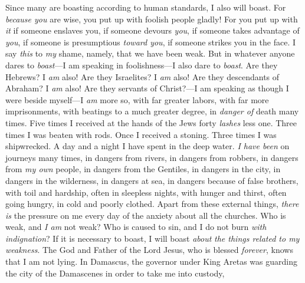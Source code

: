 \begin{biblechapter}
\verse Since many are boasting according to human standards, I also will boast.
\verse For \textit{because you} are wise, you put up with foolish people gladly!
\verse For you put up with \textit{it} if someone enslaves you, if someone devours \textit{you}, if someone takes advantage of \textit{you}, if someone is presumptious \textit{toward you}, if someone strikes you in the face.
\verse I say \textit{this} to \textit{my} shame, namely, that we have been weak.
\verse But in whatever anyone dares to \textit{boast}—I am speaking in foolishness—I also dare to \textit{boast}.
\verse Are they Hebrews? I \textit{am} also! Are they Israelites? I \textit{am} also! Are they descendants of Abraham? I \textit{am} also!
\verse Are they servants of Christ?—I am speaking as though I were beside myself—I \textit{am} more so, with far greater labors, with far more imprisonments, with beatings to a much greater degree, in \textit{danger of} death many times.
\verse Five times I received at the hands of the Jews forty \textit{lashes} less one.
\verse Three times I was beaten with rods. Once I received a stoning. Three times I was shipwrecked. A day and a night I have spent in the deep water.
\verse \textit{I have been} on journeys many times, in dangers from rivers, in dangers from robbers, in dangers from \textit{my own} people, in dangers from the Gentiles, in dangers in the city, in dangers in the wilderness, in dangers at sea, in dangers because of false brothers,
\verse with toil and hardship, often in sleepless nights, with hunger and thirst, often going hungry, in cold and poorly clothed.
\verse Apart from these external things, \textit{there is} the pressure on me every day of the anxiety about all the churches.
\verse Who is weak, and \textit{I am} not weak? Who is caused to sin, and I do not burn \textit{with indignation}?
\verse If it is necessary to boast, I will boast \textit{about} \textit{the things related to my weakness}.
\verse The God and Father of the Lord Jesus, who is blessed \textit{forever}, knows that I am not lying.
\verse In Damascus, the governor under King Aretas was guarding the city of the Damascenes in order to take me into custody,
\end{biblechapter}

